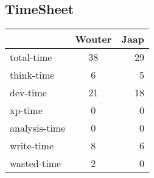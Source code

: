 \subsection*{TimeSheet}
\label{time}

\begin{tabular}{ l || c | r }
\hline
  & Wouter & Jaap \\
\hline
  total-time & 38 & 29 \\
\hline
  think-time & 6 & 5 \\
\hline
  dev-time & 21 & 18 \\
\hline
  xp-time & 0 & 0 \\
\hline
  analysis-time & 0 & 0 \\
\hline
  write-time & 8 & 6 \\
\hline
  wasted-time & 2 & 0 \\
\end{tabular}